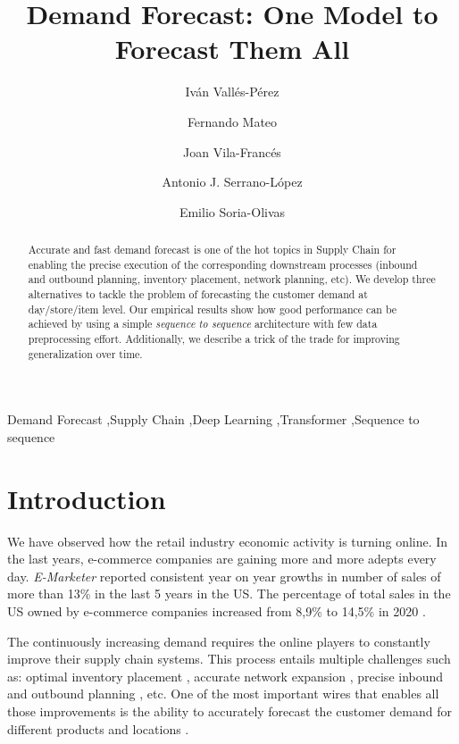 \documentclass{elsarticle}
\begin{document}
	
	\begin{frontmatter}

		\title{Demand Forecast: One Model to Forecast Them All}
		
		\author[UV]{Iván Vallés-Pérez}
		\author[UV]{Fernando Mateo}
		\author[UV]{Joan Vila-Francés}
		\author[UV]{Antonio J. Serrano-López}
		\author[UV]{Emilio Soria-Olivas}
		
		\address[UV]{Escola Tècnica Superior d\textsc{}Enginyeria, University of Valencia, Avenida de la Universitat s/n 46100 Burjassot, Valencia, Spain}
		
		\begin{abstract}
			Accurate and fast demand forecast is one of the hot topics in Supply Chain for enabling the precise execution of the corresponding downstream processes (inbound and outbound planning, inventory placement, network planning, etc). We develop three alternatives to tackle the problem of forecasting the customer demand at day/store/item level. Our empirical results show how good performance can be achieved by using a simple \textit{sequence to sequence} architecture with few data preprocessing effort. Additionally, we describe a trick of the trade for improving generalization over time.
		\end{abstract}
		
		\begin{keyword}
			Demand Forecast \sep Supply Chain \sep Deep Learning \sep Transformer \sep Sequence to sequence
		\end{keyword}
		
	\end{frontmatter}
	
	\linenumbers
	
	\section{Introduction}
	We have observed how the retail industry economic activity is turning online. In the last years, e-commerce companies are gaining more and more adepts every day. \textit{E-Marketer} reported consistent year on year growths in number of sales of more than 13\% in the last 5 years in the US. The percentage of total sales in the US owned by e-commerce companies increased from 8,9\% to 14,5\% in 2020 \cite{emarketer2019, emarketer2020}.
	
	The continuously increasing demand requires the online players to constantly improve their supply chain systems. This process entails multiple challenges such as: optimal inventory placement \cite{graves2008}, accurate network expansion \cite{hossein2017}, precise inbound and outbound planning \cite{kaipia2009}, etc. One of the most important wires that enables all those improvements is the ability to accurately forecast the customer demand for different products and locations \cite{forslund2007}.  
	
\end{document}
